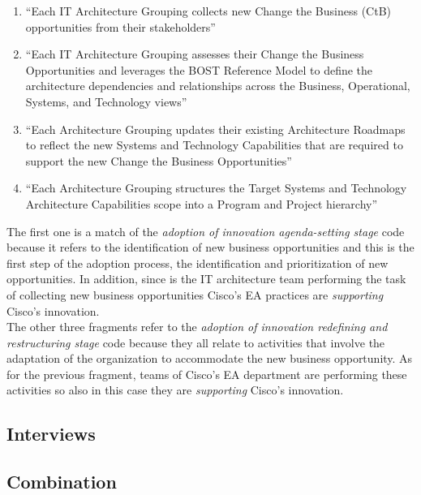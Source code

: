 \begin{enumerate}

\item ``Each IT Architecture Grouping collects new Change the Business (CtB) opportunities from their stakeholders''
\item ``Each IT Architecture Grouping assesses their Change the Business Opportunities and leverages the BOST Reference Model to define the architecture dependencies and relationships across the Business, Operational, Systems, and Technology views'' 
\item ``Each Architecture Grouping updates their existing Architecture Roadmaps to reflect the new Systems and Technology Capabilities that are required to support the new Change the Business Opportunities''
\item ``Each Architecture Grouping structures the Target Systems and Technology Architecture Capabilities scope into a Program and Project hierarchy''

\end{enumerate}

The first one is a match of the \textit{adoption of innovation agenda-setting stage} code because it refers to the identification of new business opportunities and this is the first step of the adoption process, the identification and prioritization of new opportunities. In addition, since is the IT architecture team performing the task of collecting new business opportunities Cisco's EA practices are \textit{supporting} Cisco's innovation.
\\
The other three fragments refer to the \textit{adoption of innovation redefining and restructuring stage} code because they all relate to activities that involve the adaptation of the organization to accommodate the new business opportunity. As for the previous fragment, teams of Cisco's EA department are performing these activities so also in this case they are \textit{supporting} Cisco's innovation.

\subsection{Interviews}

\subsection{Combination}


